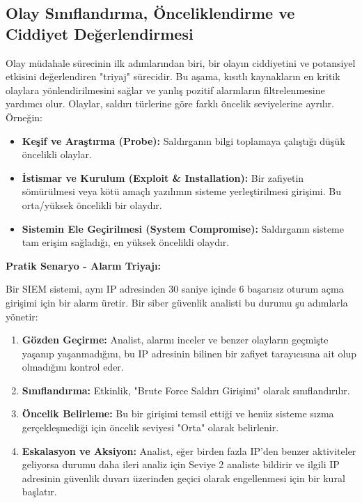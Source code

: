 \begin{itemize}
\begin{itemize}
\subsection{Olay Sınıflandırma, Önceliklendirme ve Ciddiyet Değerlendirmesi}

Olay müdahale sürecinin ilk adımlarından biri, bir olayın ciddiyetini ve potansiyel etkisini değerlendiren "triyaj" sürecidir. Bu aşama, kısıtlı kaynakların en kritik olaylara yönlendirilmesini sağlar ve yanlış pozitif alarmların filtrelenmesine yardımcı olur. Olaylar, saldırı türlerine göre farklı öncelik seviyelerine ayrılır. Örneğin:

\begin{itemize}
    \item \textbf{Keşif ve Araştırma (Probe):} Saldırganın bilgi toplamaya çalıştığı düşük öncelikli olaylar.
    \item \textbf{İstismar ve Kurulum (Exploit \& Installation):} Bir zafiyetin sömürülmesi veya kötü amaçlı yazılımın sisteme yerleştirilmesi girişimi. Bu orta/yüksek öncelikli bir olaydır.
    \item \textbf{Sistemin Ele Geçirilmesi (System Compromise):} Saldırganın sisteme tam erişim sağladığı, en yüksek öncelikli olaydır.
\end{itemize}

\textbf{Pratik Senaryo - Alarm Triyajı:}

Bir SIEM sistemi, aynı IP adresinden 30 saniye içinde 6 başarısız oturum açma girişimi için bir alarm üretir. Bir siber güvenlik analisti bu durumu şu adımlarla yönetir:

\begin{enumerate}
    \item \textbf{Gözden Geçirme:} Analist, alarmı inceler ve benzer olayların geçmişte yaşanıp yaşanmadığını, bu IP adresinin bilinen bir zafiyet tarayıcısına ait olup olmadığını kontrol eder.
    \item \textbf{Sınıflandırma:} Etkinlik, "Brute Force Saldırı Girişimi" olarak sınıflandırılır.
    \item \textbf{Öncelik Belirleme:} Bu bir girişimi temsil ettiği ve henüz sisteme sızma gerçekleşmediği için öncelik seviyesi "Orta" olarak belirlenir.
    \item \textbf{Eskalasyon ve Aksiyon:} Analist, eğer birden fazla IP'den benzer aktiviteler geliyorsa durumu daha ileri analiz için Seviye 2 analiste bildirir ve ilgili IP adresinin güvenlik duvarı üzerinden geçici olarak engellenmesi için bir kural başlatır.
\end{enumerate}


\end{itemize}
\end{itemize}
